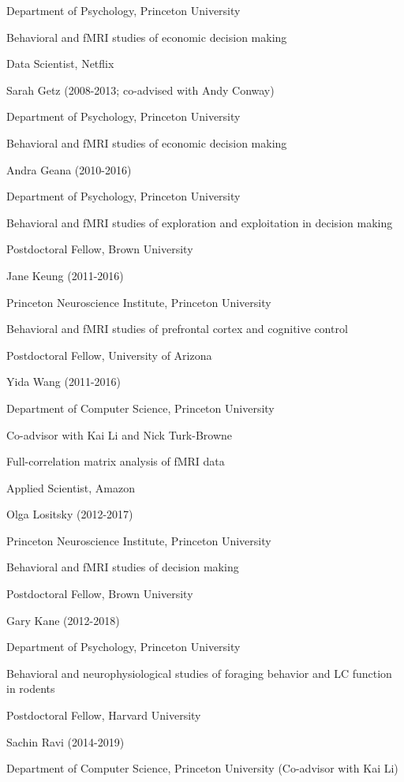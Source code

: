 \documentclass[10 pt]{article}
\begin{document}
Department of Psychology, Princeton University

Behavioral and fMRI studies of economic decision making

Data Scientist, Netflix
    \medskip

Sarah Getz (2008-2013; co-advised with Andy Conway)

Department of Psychology, Princeton University

Behavioral and fMRI studies of economic decision making
    \medskip

Andra Geana (2010-2016)

Department of Psychology, Princeton University

Behavioral and fMRI studies of exploration and exploitation in decision making

Postdoctoral Fellow, Brown University
    \medskip

Jane Keung (2011-2016)

Princeton Neuroscience Institute, Princeton University

Behavioral and fMRI studies of prefrontal cortex and cognitive control

Postdoctoral Fellow, University of Arizona
    \medskip

Yida Wang (2011-2016)

Department of Computer Science, Princeton University

Co-advisor with Kai Li and Nick Turk-Browne

Full-correlation matrix analysis of fMRI data

Applied Scientist, Amazon
    \medskip

Olga Lositsky (2012-2017)

Princeton Neuroscience Institute, Princeton University

Behavioral and fMRI studies of decision making

Postdoctoral Fellow, Brown University
    \medskip

Gary Kane (2012-2018)

Department of Psychology, Princeton University

Behavioral and neurophysiological studies of foraging behavior and LC function in rodents

Postdoctoral Fellow, Harvard University
    \medskip

Sachin Ravi (2014-2019)

Department of Computer Science, Princeton University (Co-advisor with Kai Li)
\end{document}
